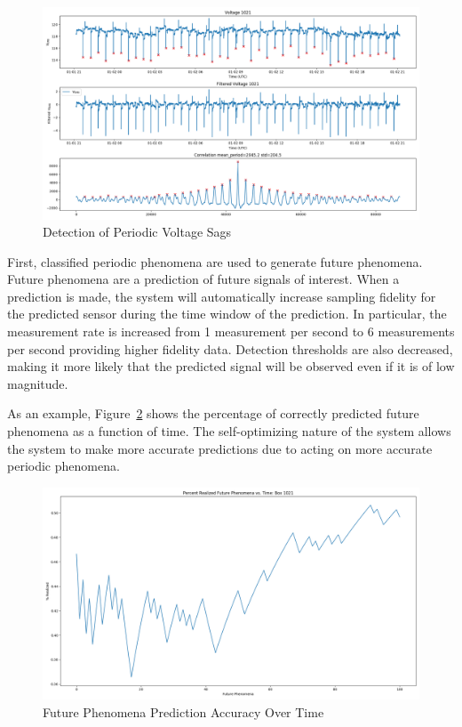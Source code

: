 \begin{figure}[H]
    \centering
    \includegraphics[width=0.75\linewidth]{images/pilot/periodic-voltage-sags.png}
    \caption{Detection of Periodic Voltage Sags}
    \label{fig:periodic-voltage-sags}
\end{figure}

First, classified periodic phenomena are used to generate future phenomena. Future phenomena are a prediction of future signals of interest. When a prediction is made, the system will automatically increase sampling fidelity for the predicted sensor during the time window of the prediction. In particular, the measurement rate is increased from 1 measurement per second to 6 measurements per second providing higher fidelity data. Detection thresholds are also decreased, making it more likely that the predicted signal will be observed even if it is of low magnitude.

As an example, Figure~\ref{fig:future-phenomena} shows the percentage of correctly predicted future phenomena as a function of time. The self-optimizing nature of the system allows the system to make more accurate predictions due to acting on more accurate periodic phenomena.

\begin{figure}[H]
    \centering
    \includegraphics[width=0.60\linewidth]{images/pilot/realized-future-phenomena.png}
    \caption{Future Phenomena Prediction Accuracy Over Time}
    \label{fig:future-phenomena}
\end{figure}

